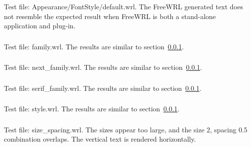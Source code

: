 \subsubsection{\FSA}
\label{sec:fs-default}
Test file: Appearance/FontStyle/default.wrl.
The FreeWRL generated text does not resemble the expected result when
FreeWRL is both a stand-alone application and plug-in.

\subsubsection{\FSB}
\label{sec:3-families}
Test file: family.wrl.\newline
The results are similar to section~\ref{sec:fs-default}.

\subsubsection{\FSC}
Test file: next\_family.wrl.\newline
The results are similar to section~\ref{sec:fs-default}.

\subsubsection{\FSD}
Test file: serif\_family.wrl.\newline
The results are similar to section~\ref{sec:fs-default}.

\subsubsection{\FSE}
Test file: style.wrl.\newline
The results are similar to section~\ref{sec:fs-default}.

\subsubsection{\FSF}
Test file: size\_spacing.wrl.\newline
The sizes appear too large, and the size 2, spacing 0.5 combination overlaps.
The vertical text is rendered horizontally.  

